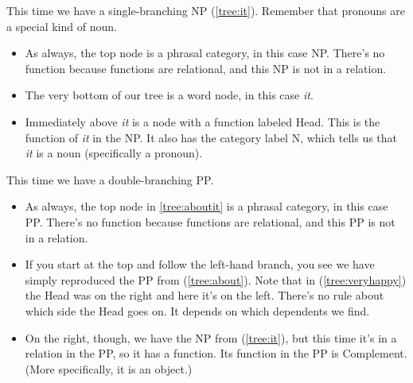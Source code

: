 This time we have a single-branching NP (\ref{tree:it}). Remember that pronouns are a special kind of noun.
\begin{itemize}[noitemsep]
    \item As always, the top node is a phrasal category, in this case NP. There's no function because functions are relational, and this NP is not in a relation.
    \item The very bottom of our tree is a word node, in this case \textit{it}.
    \item Immediately above \textit{it} is a node with a function labeled Head. This is the function of \textit{it} in the NP. It also has the category label N, which tells us that \textit{it} is a noun (specifically a pronoun).
\end{itemize}

\ea {}\label{tree:it}
\z

This time we have a double-branching PP.
\begin{itemize}[noitemsep]
    \item As always, the top node in \ref{tree:aboutit} is a phrasal category, in this case PP. There's no function because functions are relational, and this PP is not in a relation.
    \item If you start at the top and follow the left-hand branch, you see we have simply reproduced the PP from (\ref{tree:about}). Note that in (\ref{tree:veryhappy}) the Head was on the right and here it's on the left. There's no rule about which side the Head goes on. It depends on which dependents we find.
    \item On the right, though, we have the NP from (\ref{tree:it}), but this time it's in a relation in the PP, so it has a function. Its function in the PP is Complement. (More specifically, it is an object.)
\end{itemize}

